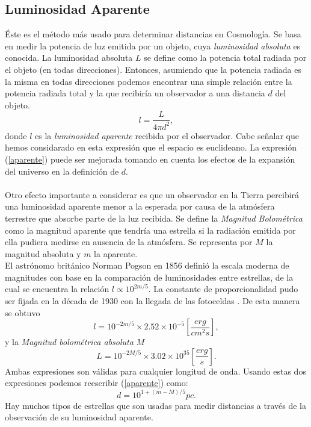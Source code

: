 \subsection{Luminosidad Aparente}
Éste es el método más usado para determinar distancias en Cosmología. Se basa en medir la potencia de luz emitida por un objeto,
cuya \textit{luminosidad absoluta} es conocida. La luminosidad absoluta $L$ se define como la potencia total radiada por el objeto 
(en todas direcciones). Entonces, asumiendo que la potencia radiada es la misma en todas direcciones podemos encontrar una simple 
relación entre la potencia radiada total y la que recibiría un observador a una distancia $d$ del objeto.
\begin{equation}
l=\frac{L}{4\pi d^2}, \label{aparente}
\end{equation}
donde $l$ es la \textit{luminosidad aparente} recibida por el observador. Cabe señalar que hemos considarado en esta 
expresión que el espacio es euclideano.
La expresión (\ref{aparente}) puede ser mejorada tomando en cuenta los efectos de la expansión del universo en la definición 
de $d$.\\ \\
Otro efecto importante a considerar es que un observador en la Tierra percibirá una luminosidad aparente menor a la 
esperada por causa de la atmósfera terrestre que absorbe parte de la luz recibida.
Se define la \textit{Magnitud Bolométrica} como la  magnitud aparente que tendría una estrella si la radiación
emitida por ella pudiera medirse en ausencia de la atmósfera. Se representa por $M$ la magnitud absoluta y $m$ la aparente.\\
El astrónomo británico Norman Pogson en 1856 definió la escala moderna de magnitudes con base en la comparación 
de luminosidades entre estrellas, de la cual se encuentra la relación $l \propto 10^{2m/5}$. La constante 
de proporcionalidad pudo ser fijada en la década de 1930 con la llegada de las fotoceldas \cite{Hubble2}. 
De esta manera se obtuvo
\begin{equation}
l=10^{-2m/5}\times 2.52 \times 10^{-5} \left [\frac{erg}{cm^{2}s}\right ],
\end{equation}
 y la \textit{Magnitud bolométrica absoluta} $M$ 
\begin{equation}
L=10^{-2M/5}\times 3.02 \times 10^{35} \left [ \frac{erg}{s}\right ].
\end{equation}
Ambas expresiones son válidas para cualquier longitud de onda. Usando estas dos expresiones podemos reescribir (\ref{aparente}) como:
\begin{equation}
d=10^{1+(m-M)/5}pc.    \label{d}
\end{equation}
Hay muchos tipos de estrellas que son usadas para medir distancias a través de la observación de su luminosidad aparente.

